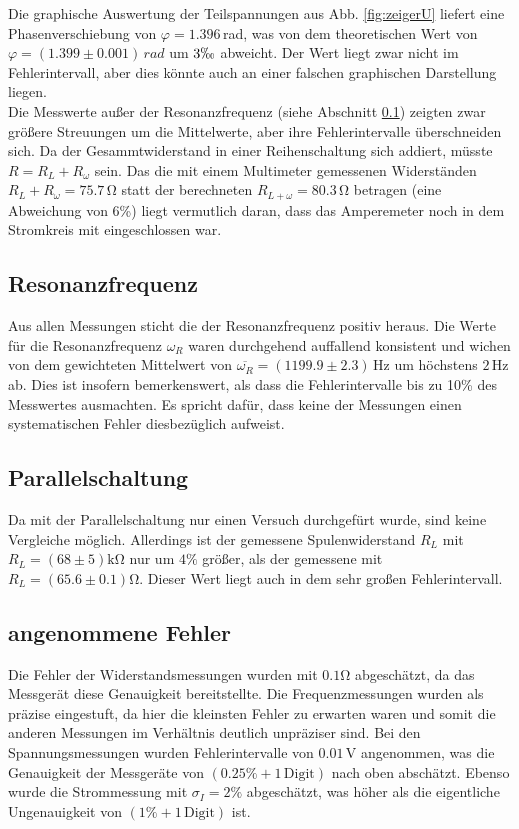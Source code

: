 \documentclass[12pt,a4paper,titlepage,headinclude,bibtotoc]{scrartcl}
\begin{document}
Die graphische Auswertung der Teilspannungen aus Abb. \ref{fig:zeigerU} liefert eine Phasenverschiebung von $\varphi=1.396\,$rad, was von dem theoretischen Wert von $\varphi=(1.399 \pm 0.001)\,\si{rad}$ um $3\permil$ abweicht.
Der Wert liegt zwar nicht im Fehlerintervall, aber dies könnte auch an einer falschen graphischen Darstellung liegen.\\

Die Messwerte außer der Resonanzfrequenz (siehe Abschnitt \ref{sec:resodisku}) zeigten zwar größere Streuungen um die Mittelwerte, aber ihre Fehlerintervalle überschneiden sich.
Da der Gesammtwiderstand in einer Reihenschaltung sich addiert, müsste $R=R_L+R_\omega$ sein.
Das die mit einem Multimeter gemessenen Widerständen $R_L+R_\omega=75.7\,\si\ohm$ statt der berechneten $R_{L+\omega}=80.3\,\si\ohm$ betragen (eine Abweichung von 6\%) liegt vermutlich daran, dass das Amperemeter noch in dem Stromkreis mit eingeschlossen war.


\subsection{Resonanzfrequenz}
\label{sec:resodisku}
Aus allen Messungen sticht die der Resonanzfrequenz positiv heraus.
Die Werte für die Resonanzfrequenz $\omega_R$ waren durchgehend auffallend konsistent und wichen von dem gewichteten Mittelwert von $\overline{\omega_R}=(1199.9\pm2.3)\,\si\hertz$ um höchstens $2\,\si\hertz$ ab.
Dies ist insofern bemerkenswert, als dass die Fehlerintervalle bis zu 10\% des Messwertes ausmachten.
Es spricht dafür, dass keine der Messungen einen systematischen Fehler diesbezüglich aufweist.

\subsection{Parallelschaltung}
Da mit der Parallelschaltung nur einen Versuch durchgefürt wurde, sind keine Vergleiche möglich.
Allerdings ist der gemessene Spulenwiderstand $R_L$ mit $R_L=(68\pm 5)\si{\kilo\ohm}$ nur um $4\%$ größer, als der gemessene mit $R_L=(65.6\pm0.1)\si\ohm$.
Dieser Wert liegt auch in dem sehr großen Fehlerintervall.

\subsection{angenommene Fehler}
Die Fehler der Widerstandsmessungen wurden mit $0.1\si\ohm$ abgeschätzt, da das Messgerät diese Genauigkeit bereitstellte.
Die Frequenzmessungen wurden als präzise eingestuft, da hier die kleinsten Fehler zu erwarten waren und somit die anderen Messungen im Verhältnis deutlich unpräziser sind.
Bei den Spannungsmessungen wurden Fehlerintervalle von $0.01\,\si\volt$ angenommen, was die Genauigkeit der Messgeräte von $(0.25\%+1\,\text{Digit})$ nach oben abschätzt.
Ebenso wurde die Strommessung mit $\sigma_I=2\%$ abgeschätzt, was höher als die eigentliche Ungenauigkeit von $(1\%+1\,\text{Digit})$ ist.




\end{document}
